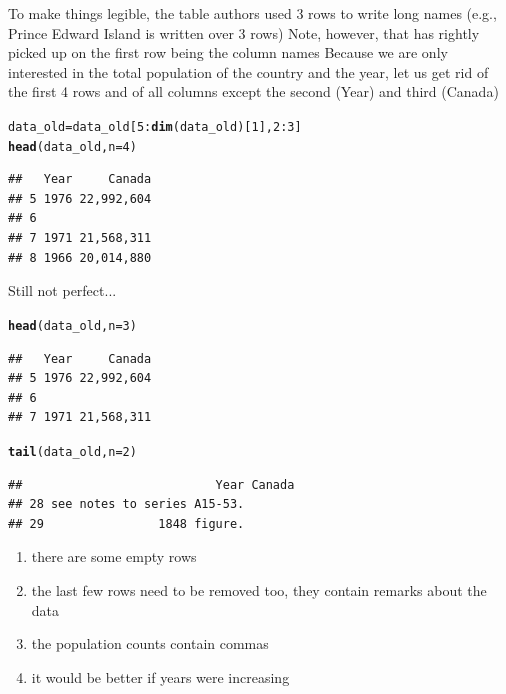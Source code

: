 \documentclass[aspectratio=169]{beamer}\usepackage[]{graphicx}\usepackage[]{xcolor}
\makeatletter
\newcommand{\hlnum}[1]{\textcolor[rgb]{0.686,0.059,0.569}{#1}}%
\newcommand{\hlopt}[1]{\textcolor[rgb]{0,0,0}{#1}}%
\newcommand{\hldef}[1]{\textcolor[rgb]{0.345,0.345,0.345}{#1}}%
\newcommand{\hlkwb}[1]{\textcolor[rgb]{0.69,0.353,0.396}{#1}}%
\newcommand{\hlkwc}[1]{\textcolor[rgb]{0.333,0.667,0.333}{#1}}%
\newcommand{\hlkwd}[1]{\textcolor[rgb]{0.737,0.353,0.396}{\textbf{#1}}}%
\newenvironment{kframe}{%
 \def\at@end@of@kframe{}%
 \ifinner\ifhmode%
  \def\at@end@of@kframe{\end{minipage}}%
  \begin{minipage}{\columnwidth}%
 \fi\fi%
 \def\FrameCommand##1{\hskip\@totalleftmargin \hskip-\fboxsep
 \colorbox{shadecolor}{##1}\hskip-\fboxsep
     \hskip-\linewidth \hskip-\@totalleftmargin \hskip\columnwidth}%
 \MakeFramed {\advance\hsize-\width
   \@totalleftmargin\z@ \linewidth\hsize
   \@setminipage}}%
 {\par\unskip\endMakeFramed%
 \at@end@of@kframe}
\newenvironment{knitrout}{}{} %
\makeatother
\begin{document}
\begin{frame}[fragile]
To make things legible, the table authors used 3 rows to write long names (e.g., Prince Edward Island is written over 3 rows)
\vfill
Note, however, that  has rightly picked up on the first row being the column names
\vfill
Because we are only interested in the total population of the country and the year, let us get rid of the first 4 rows and of all columns except the second (Year) and third (Canada)

\begin{knitrout}
\color{fgcolor}\begin{kframe}
\begin{alltt}
\hldef{data_old} \hlkwb{=} \hldef{data_old[}\hlnum{5}\hlopt{:}\hlkwd{dim}\hldef{(data_old)[}\hlnum{1}\hldef{],} \hlnum{2}\hlopt{:}\hlnum{3}\hldef{]}
\hlkwd{head}\hldef{(data_old,} \hlkwc{n}\hldef{=}\hlnum{4}\hldef{)}
\end{alltt}
\begin{verbatim}
##   Year     Canada
## 5 1976 22,992,604
## 6                
## 7 1971 21,568,311
## 8 1966 20,014,880
\end{verbatim}
\end{kframe}
\end{knitrout}
\end{frame}


\begin{frame}[fragile]{Still not perfect...}
\begin{knitrout}
\color{fgcolor}\begin{kframe}
\begin{alltt}
\hlkwd{head}\hldef{(data_old,} \hlkwc{n}\hldef{=}\hlnum{3}\hldef{)}
\end{alltt}
\begin{verbatim}
##   Year     Canada
## 5 1976 22,992,604
## 6                
## 7 1971 21,568,311
\end{verbatim}
\begin{alltt}
\hlkwd{tail}\hldef{(data_old,} \hlkwc{n}\hldef{=}\hlnum{2}\hldef{)}
\end{alltt}
\begin{verbatim}
##                           Year Canada
## 28 see notes to series A15-53.       
## 29                1848 figure.
\end{verbatim}
\end{kframe}
\end{knitrout}
\begin{enumerate}
\item there are some empty rows
\vfill
\item the last few rows need to be removed too, they contain remarks about the data
\vfill
\item the population counts contain commas
\vfill
\item it would be better if years were increasing
\end{enumerate}
\end{frame}
\end{document}
